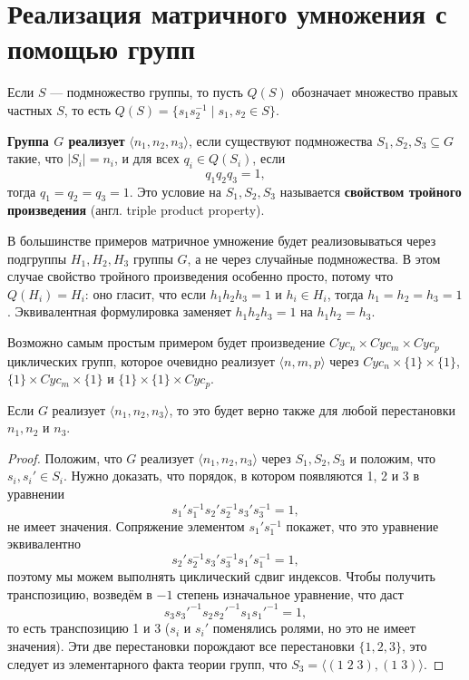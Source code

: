 \section{Реализация матричного умножения с помощью групп}\label{sec:realizing}

Если $S$ --- подмножество группы, то пусть $Q(S)$ обозначает множество правых частных $S$, то есть $Q(S)=\{ s_1 s_2^{-1} \mid s_1,s_2 \in S\}$.

\begin{definition}\label{def:tpp}
  \textbf{Группа $G$ реализует} $\langle n_1, n_2, n_3 \rangle$, если существуют подмножества $S_1, S_2, S_3 \subseteq G$ такие, что $|S_i| = n_i$, и для всех $q_i \in Q(S_i)$, если 
  \[
  	q_1 q_2 q_3 = 1,
  \]
  тогда $q_1 = q_2 = q_3 = 1$. Это условие на $S_1, S_2, S_3$ называется \textbf{свойством тройного произведения}  (англ. triple product property).
\end{definition}

В большинстве примеров матричное умножение будет реализовываться через подгруппы $H_1, H_2, H_3$ группы $G$, а не через случайные подмножества. В этом случае свойство тройного произведения особенно просто, потому что $Q(H_i)=H_i$: оно гласит, что если $h_1 h_2 h_3 = 1$ и $h_i \in H_i$, тогда $h_1 = h_2 = h_3 = 1$. Эквивалентная формулировка заменяет $h_1 h_2 h_3 = 1$ на $h_1 h_2 = h_3$.

Возможно самым простым примером будет произведение $Cyc_n \times Cyc_m \times Cyc_p$ циклических групп, которое очевидно реализует $\langle n, m, p \rangle$ через $Cyc_n \times \{1\} \times \{1\}$, $\{1\} \times Cyc_m \times \{1\}$ и $\{1\} \times \{1\} \times Cyc_p$.

\begin{lemma}
  Если $G$ реализует $\langle n_1, n_2, n_3 \rangle$, то это будет верно также для любой перестановки $n_1, n_2$ и $n_3$.
\end{lemma}
\begin{proof}
Положим, что $G$ реализует $\langle n_1, n_2, n_3 \rangle$ через $S_1, S_2, S_3$ и положим, что $s_i, s_i' \in S_i$. Нужно доказать, что порядок, в котором появляются 1, 2 и 3 в уравнении
\[
	s_1' s_1^{-1} s_2' s_2^{-1} s_3' s_3^{-1}=1,
\]
не имеет значения. Сопряжение элементом $s_1' s_1^{-1}$ покажет, что это уравнение эквивалентно
\[
	s_2' s_2^{-1} s_3' s_3^{-1} s_1' s_1^{-1} =1,
\]
поэтому мы можем выполнять циклический сдвиг индексов. Чтобы получить транспозицию, возведём в $-1$ степень изначальное уравнение, что даст
\[
	s_3 s_3'^{-1} s_2 s_2'^{-1} s_1 s_1'^{-1}=1,
\]
то есть транспозицию 1 и 3 ($s_i$ и $s_i'$ поменялись ролями, но это не имеет значения). Эти две перестановки порождают все перестановки $\{1, 2, 3 \}$, это следует из элементарного факта теории групп, что $S_3 = \langle (1\;2\;3), (1\;3) \rangle$. 
\end{proof}

